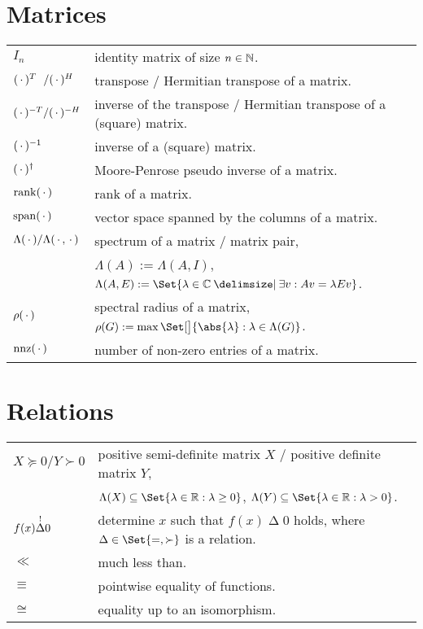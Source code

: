 \section*{Matrices}

\noindent
\begin{tabular}{@{}p{2.5cm}l}
  $I_n$ & identity matrix of size $n\in\mathbb{N}$. \\
  $\mathrlap{(\optional{})^\T} \hphantom{(\optional{})^{-\T}} / (\optional{})^\HT$ & transpose / Hermitian transpose of a matrix. \\
  $(\optional{})^{-\T} / (\optional{})^{-\HT}$ & inverse of the transpose / Hermitian transpose of a (square) matrix. \\
  $(\optional{})^{-1}$ & inverse of a (square) matrix. \\
  $(\optional{})^\MP$ & Moore-Penrose pseudo inverse of a matrix. \\
  $\rank(\optional{})$ & rank of a matrix. \\
  $\colspan(\optional{})$ & vector space spanned by the columns of a matrix. \\
  $\Lambda(\optional{}) / \Lambda(\optional{},\optional{})$ & spectrum of a matrix / matrix pair,\\
    & $\Lambda(A) := \Lambda(A, I)$, $\Lambda(A, E) := \Set{\lambda\in\C \given \exists v : Av = \lambda Ev}$. \\
  $\rho(\optional{})$ & spectral radius of a matrix, $\rho(G) := \max\Set[\big]{\abs{\lambda} : \lambda\in\Lambda(G)}$. \\
  $\nnz(\optional{})$ & number of non-zero entries of a matrix.
\end{tabular}

\section*{Relations}

\noindent
\begin{tabular}{@{}p{2.5cm}l}
  $X \succeq 0 / Y \succ 0$ & positive semi-definite matrix $X$ / positive definite matrix $Y$, \\
    & $\Lambda(X) \subseteq \Set{\lambda\in\R : \lambda\geq 0}$, $\Lambda(Y) \subseteq \Set{\lambda\in\R : \lambda > 0}$. \\
  $f(x) \smash{\mathrel{\overset{!}{\Delta}}} 0$ & determine $x$ such that $f(x) \mathrel{\Delta} 0$ holds, where $\Delta\in\Set{=,\succ}$ is a relation. \\
  $\ll$ & much less than. \\
  $\equiv$ & pointwise equality of functions. \\
  $\cong$ & equality up to an isomorphism.
\end{tabular}

